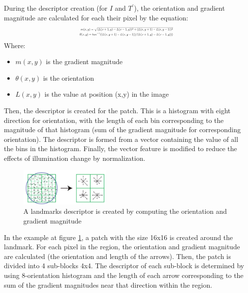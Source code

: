 \documentclass[twoside,twocolumn,10pt]{article}
\begin{document}
During the descriptor creation (for \textit{$I$} and \textit{$T^{'}$}), the orientation and gradient magnitude are calculated for each their pixel by the equation:
\begin{equation}
\label{eq:sift}
\resizebox{.4 \textwidth}{!} 
{$
\begin{aligned}
	m(x,y) = \sqrt{(L(x+1,y) - L(x-1,y))^2 + (L(x,y+1) - L(x,y-1))^2} \\
	\theta(x,y) = tan^{-1}((L(x,y+1) - L(x,y-1))/(L(x+1,y) - L(x-1,y)))
	\end{aligned}
$}
\end{equation}
Where:
\begin{itemize}
	\item $m(x,y)$ is the gradient magnitude
	\item $\theta(x,y)$ is the orientation
	\item $L(x,y)$ is the value at position (x,y) in the image
\end{itemize}
Then, the descriptor is created for the patch. This is a histogram with eight direction for orientation, with the length of each bin corresponding to the magnitude of that histogram (sum of the gradient magnitude for corresponding orientation). The descriptor is formed from a vector containing the value of all the bins in the histogram. Finally, the vector feature is modified to reduce the effects of illumination change by normalization.

\begin{figure}[htb]
    \centering
    \includegraphics[width=0.4\textwidth]{./images/keypoint_descriptor}
    \caption{A landmarks descriptor is created by computing the orientation and gradient magnitude}
    \label{fig:kpdescriptor}
\end{figure}

In the example at figure \ref{fig:kpdescriptor}, a patch with the size 16x16 is created around the landmark. For each pixel in the region, the orientation and gradient magnitude are calculated (the orientation and length of the arrows). Then, the patch is divided into 4 sub-blocks 4x4. The descriptor of each sub-block is determined by using 8-orientation histogram and the length of each arrow corresponding to the sum of the gradient magnitudes near that direction within the region.\\
\end{document}
